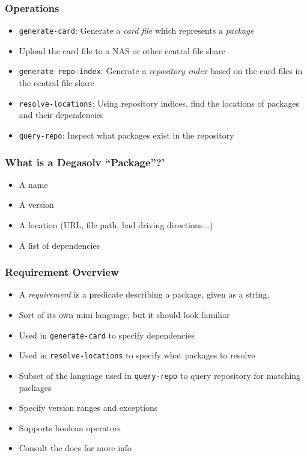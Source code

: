\documentclass{beamer}
\begin{document}
\begin{frame}
  \frametitle{Operations}
  \begin{itemize}
      \item \texttt{generate-card}: Generate a \textit{card file} which
          represents a \textit{package}
  \item Upload the card file to a NAS or other central file share
  \item \texttt{generate-repo-index}: Generate a \textit{repository index}
    based on the card files in the central file share
  \item \texttt{resolve-locations}: Using repository indices, find the
      locations of packages and their dependencies
  \item \texttt{query-repo}: Inspect what packages exist in the repository
  \end{itemize}
\end{frame}
\begin{frame}
  \frametitle{What is a Degasolv ``Package''?'}
  \begin{itemize}
  \item A name
  \item A version
  \item A location (URL, file path, bad driving directions...)
  \item A list of dependencies
  \end{itemize}
\end{frame}
\begin{frame}
  \frametitle{Requirement Overview}
  \begin{itemize}
      \item A \textit{requirement} is a predicate describing a package, given
          as a string.
  \item Sort of its own mini language, but it should look familiar
  \item Used in \texttt{generate-card} to specify dependencies
  \item Used in \texttt{resolve-locations} to specify what packages to resolve
  \item Subset of the language used in \texttt{query-repo} to query repository
      for matching packages
\item Specify version ranges and exceptions
  \item Supports boolean operators
  \item Consult the docs for more info
  \end{itemize}
\end{frame}
\end{document}

